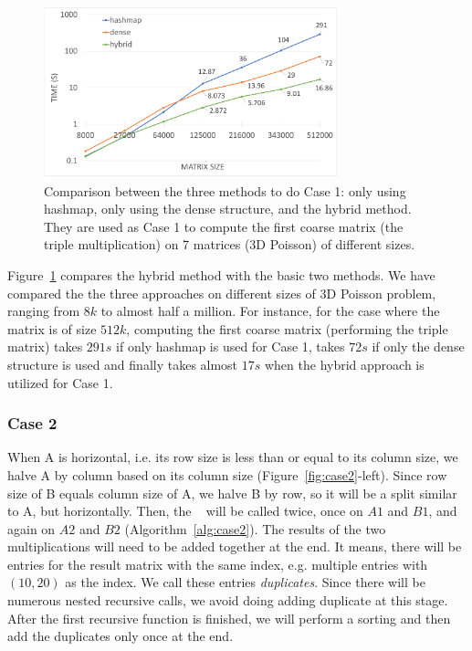 \begin{figure}[tbh]
 \centering
 \includegraphics[width=8.5cm,height=5cm]{./figures/mix.pdf}
 \caption{Comparison between the three methods to do Case 1: only using hashmap, only using the dense structure, and the hybrid method. They are used as Case 1 to compute the first coarse matrix (the triple multiplication) on 7 matrices (3D Poisson) of different sizes.}
 \label{fig:mix}
\end{figure}

Figure~\ref{fig:mix} compares the hybrid method with the basic two methods. We have compared the the three approaches on different sizes of 3D Poisson problem, ranging from $8k$ to almost half a million. For instance, for the case where the matrix is of size $512k$, computing the first coarse matrix (performing the triple matrix) takes $291s$ if only hashmap is used for Case 1, takes $72s$ if only the dense structure is used and finally takes almost $17s$ when the hybrid approach is utilized for Case 1.


\subsubsection{Case 2}
\label{sec:case2}
When A is horizontal, i.e. its row size is less than or equal to its column size, we halve A by column based on its column size (Figure~\ref{fig:case2}-left). Since row size of B equals column size of A, we halve B by row, so it will be a split similar to A, but horizontally.
Then, the \recmm~ will be called twice, once on $A1$ and $B1$, and again on $A2$ and $B2$ (Algorithm~\ref{alg:case2}). The results of the two multiplications will need to be added together at the end. It means, there will be entries for the result matrix with the same index, e.g. multiple entries with $(10, 20)$ as the index. We call these entries \textit{duplicates}. Since there will be numerous nested recursive calls, we avoid doing adding duplicate at this stage. After the first recursive function is finished, we will perform a sorting and then add the duplicates only once at the end.

